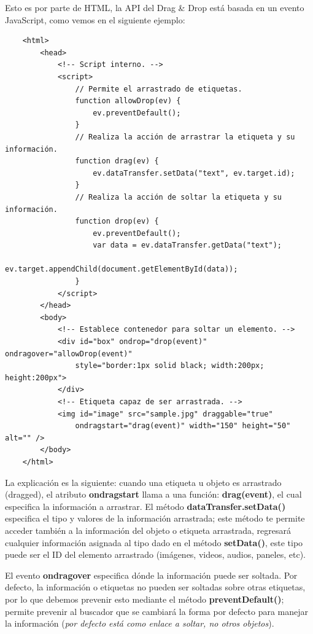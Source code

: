 Esto es por parte de HTML, la API del Drag \& Drop está basada en un evento JavaScript, como vemos en el siguiente ejemplo:
\begin{lstlisting}
    <html>
        <head>
            <!-- Script interno. -->
            <script>
                // Permite el arrastrado de etiquetas.
                function allowDrop(ev) {
                    ev.preventDefault();
                }
                // Realiza la acción de arrastrar la etiqueta y su información.
                function drag(ev) {
                    ev.dataTransfer.setData("text", ev.target.id);
                }
                // Realiza la acción de soltar la etiqueta y su información.
                function drop(ev) {
                    ev.preventDefault();
                    var data = ev.dataTransfer.getData("text");
                    ev.target.appendChild(document.getElementById(data));
                }
            </script>
        </head>
        <body>
            <!-- Establece contenedor para soltar un elemento. -->
            <div id="box" ondrop="drop(event)" ondragover="allowDrop(event)"
                style="border:1px solid black; width:200px; height:200px">
            </div>
            <!-- Etiqueta capaz de ser arrastrada. -->
            <img id="image" src="sample.jpg" draggable="true"
                ondragstart="drag(event)" width="150" height="50" alt="" />
        </body>
    </html>
\end{lstlisting}

La explicación es la siguiente: cuando una etiqueta u objeto es arrastrado (dragged), el atributo \textbf{ondragstart} llama a una función: \textbf{drag(event)}, el cual especifica la información a arrastrar. El método \textbf{dataTransfer.setData()} especifica el tipo y valores de la información arrastrada; este método te permite acceder también a la información del objeto o etiqueta arrastrada, regresará cualquier información asignada al tipo dado en el método \textbf{setData()}, este tipo puede ser el ID del elemento arrastrado (imágenes, videos, audios, paneles, etc).

El evento \textbf{ondragover} especifica dónde la información puede ser soltada. Por defecto, la información o etiquetas no pueden ser soltadas sobre otras etiquetas, por lo que debemos prevenir esto mediante el método \textbf{preventDefault()}; permite prevenir al buscador que se cambiará la forma por defecto para manejar la información (\textit{por defecto está como enlace a soltar, no otros objetos}).

